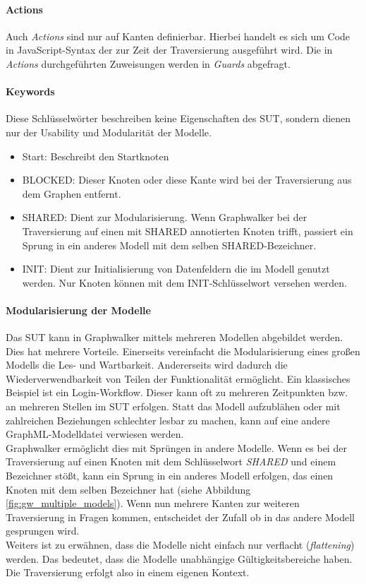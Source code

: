 \paragraph{Actions} Auch \textit{Actions} sind nur auf Kanten definierbar. Hierbei handelt es sich um Code in JavaScript-Syntax der zur Zeit der Traversierung ausgeführt wird. Die in \textit{Actions} durchgeführten Zuweisungen werden in \textit{Guards} abgefragt.

\paragraph{Keywords} Diese Schlüsselwörter beschreiben keine Eigenschaften des SUT, sondern dienen nur der Usability und Modularität der Modelle.


\begin{itemize}
\item Start:  Beschreibt den Startknoten
\item BLOCKED: Dieser Knoten oder diese Kante wird bei der Traversierung aus dem Graphen entfernt.
\item SHARED: Dient zur Modularisierung. Wenn Graphwalker bei der Traversierung auf einen mit SHARED annotierten Knoten trifft, passiert ein Sprung in ein anderes Modell mit dem selben SHARED-Bezeichner.
\item INIT: Dient zur Initialisierung von Datenfeldern die im Modell genutzt werden. Nur Knoten können mit dem INIT-Schlüsselwort versehen werden.
\end{itemize} 

\paragraph{Modularisierung der Modelle}
\label{sec:graphwalker_modularisierung}
Das SUT kann in Graphwalker mittels mehreren Modellen abgebildet werden. Dies hat mehrere Vorteile. Einerseits vereinfacht die Modularisierung eines großen Modells die Les- und Wartbarkeit. Andererseits wird dadurch die Wiederverwendbarkeit von Teilen der Funktionalität ermöglicht. Ein klassisches Beispiel ist ein Login-Workflow. Dieser kann oft zu mehreren Zeitpunkten bzw. an mehreren Stellen im SUT erfolgen. Statt das Modell aufzublähen oder mit zahlreichen Beziehungen schlechter lesbar zu machen, kann auf eine andere GraphML-Modelldatei verwiesen werden.\\
Graphwalker ermöglicht dies mit Sprüngen in andere Modelle. Wenn es bei der Traversierung auf einen Knoten mit dem Schlüsselwort \textit{SHARED} und einem Bezeichner stößt, kann ein Sprung in ein anderes Modell erfolgen, das einen Knoten mit dem selben Bezeichner hat (siehe Abbildung \ref{fig:gw_multiple_models}). Wenn nun mehrere Kanten zur weiteren Traversierung in Fragen kommen, entscheidet der Zufall ob in das andere Modell gesprungen wird.\\
Weiters ist zu erwähnen, dass die Modelle nicht einfach nur verflacht (\textit{flattening}) werden. Das bedeutet, dass die Modelle unabhängige Gültigkeitsbereiche haben. Die Traversierung erfolgt also in einem eigenen Kontext.

